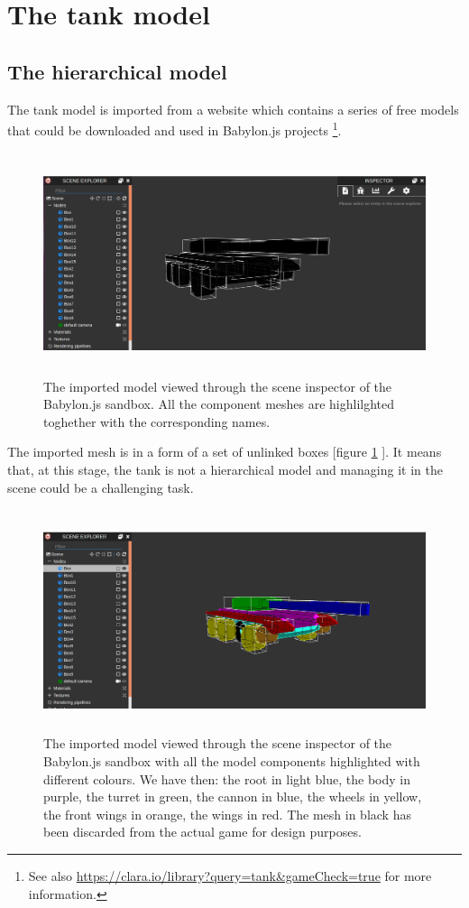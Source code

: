 \documentclass[14pt]{article}
\begin{document}
\section{The tank model}
\subsection{The hierarchical model}
The tank model is imported from a website which contains a series of free models that could be downloaded and used in Babylon.js projects \footnote{See also \url{https://clara.io/library?query=tank&gameCheck=true} for more information.}. 

\begin{figure}[H]
\center
\includegraphics[width=12cm, height= 6.5cm]{images/model_sandbox.png}
\caption{The imported model viewed through the scene inspector of the Babylon.js sandbox. All the component meshes are highlilghted toghether with the corresponding names.}
\label{img:modelSandbox}
\end{figure}


The imported mesh is in a form of a set of unlinked boxes [figure \ref{img:modelSandbox} ]. It means that, at this stage, the tank is not a hierarchical model and managing it in the scene could be a challenging task.\\


\begin{figure}[H]
\center
\includegraphics[width=12cm, height= 6.5cm]{images/evidencedModel.png}
\caption{The imported model viewed through the scene inspector of the Babylon.js sandbox with all the model components highlighted with different colours. We have then: the root in light blue, the body in purple, the turret in green, the cannon in blue, the wheels in yellow, the front wings in orange, the wings in red. The mesh in black has been discarded from the actual game for design purposes.}
\label{img:modelInspection}
\end{figure}
\end{document}
